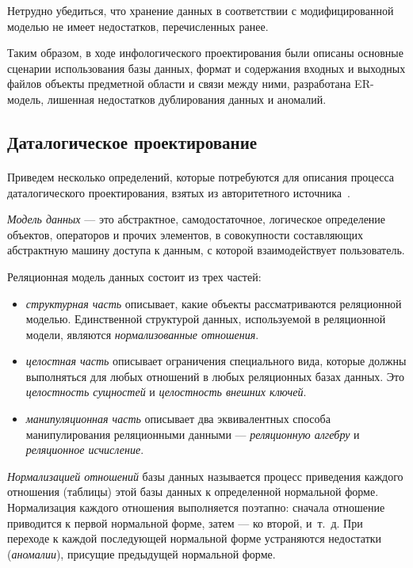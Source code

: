 Нетрудно убедиться,
что хранение данных в соответствии с модифицированной моделью не имеет
недостатков, перечисленных ранее.

Таким образом, в ходе инфологического проектирования были описаны основные
сценарии использования базы данных, формат и содержания входных и выходных файлов
объекты предметной области и связи между ними, разработана ER-модель, лишенная
недостатков дублирования данных и аномалий.

\subsection{Даталогическое проектирование}
\label{ssub:db_data_stage}

\paragraph{}
Приведем несколько определений, которые потребуются для описания процесса
даталогического проектирования, взятых из авторитетного источника~\cite{date05}.

\textit{Модель данных} --- это абстрактное, самодостаточное,
логическое определение объектов, операторов и прочих элементов,
в совокупности составляющих абстрактную  машину доступа к данным,
с которой взаимодействует пользователь.

Реляционная модель данных состоит из трех частей:
\begin{itemize}
\item
  \textit{структурная часть} описывает, какие объекты рассматриваются
  реляционной моделью.
  Единственной структурой данных, используемой в реляционной модели,
  являются \textit{нормализованные отношения}.
\item
  \textit{целостная часть} описывает ограничения специального вида,
  которые должны выполняться для любых отношений в любых реляционных базах данных.
  Это \textit{целостность сущностей} и \textit{целостность внешних ключей}.
\item
  \textit{манипуляционная часть} описывает два эквивалентных способа
  манипулирования реляционными данными --- \textit{реляционную алгебру} и
  \textit{реляционное исчисление}.
\end{itemize}

\textit{Нормализацией отношений} базы данных называется процесс приведения каждого отношения
(таблицы) этой базы данных к определенной нормальной форме.
Нормализация каждого отношения выполняется поэтапно:
сначала отношение приводится к первой нормальной форме, затем --- ко второй, и~т.~д.
При переходе к каждой последующей нормальной форме устраняются недостатки
(\textit{аномалии}), присущие предыдущей нормальной форме.

